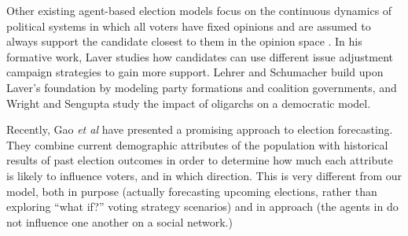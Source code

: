 Other existing agent-based election models focus on the continuous dynamics of
political systems in which all voters have fixed opinions and are assumed to
always support the candidate closest to them in the opinion space
\cite{kollman_adaptive_1992,laver_policy_2005,lehrer_governator_2018,
wright_modeling_2015}. In his formative work, Laver\cite{laver_policy_2005}
studies how candidates can use different issue adjustment campaign strategies
to gain more support. Lehrer and Schumacher\cite{lehrer_governator_2018} build
upon Laver's foundation by modeling party formations and coalition governments,
and Wright and Sengupta\cite{wright_modeling_2015} study the impact of
oligarchs on a democratic model.

Recently, Gao \textit{et al}\cite{gao_forecasting_2022} have presented a
promising approach to election forecasting. They combine current demographic
attributes of the population with historical results of past election outcomes
in order to determine how much each attribute is likely to influence voters,
and in which direction. This is very different from our model, both in purpose
(actually forecasting upcoming elections, rather than exploring ``what if?''
voting strategy scenarios) and in approach (the agents in
\cite{gao_forecasting_2022} do not influence one another on a social network.)


